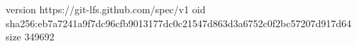 version https://git-lfs.github.com/spec/v1
oid sha256:eb7a7241a9f7dc96cfb9013177dc0c21547d863d3a6752c0f2bc57207d917d64
size 349692

